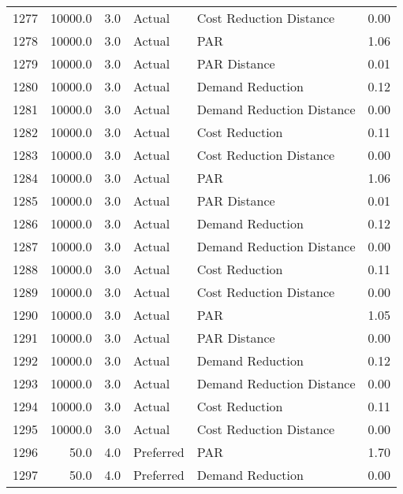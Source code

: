 \begin{longtable}{lrrllr}
1277 &      10000.0 &     3.0 &         Actual &    Cost Reduction Distance &   0.00 \\
1278 &      10000.0 &     3.0 &         Actual &                        PAR &   1.06 \\
1279 &      10000.0 &     3.0 &         Actual &               PAR Distance &   0.01 \\
1280 &      10000.0 &     3.0 &         Actual &           Demand Reduction &   0.12 \\
1281 &      10000.0 &     3.0 &         Actual &  Demand Reduction Distance &   0.00 \\
1282 &      10000.0 &     3.0 &         Actual &             Cost Reduction &   0.11 \\
1283 &      10000.0 &     3.0 &         Actual &    Cost Reduction Distance &   0.00 \\
1284 &      10000.0 &     3.0 &         Actual &                        PAR &   1.06 \\
1285 &      10000.0 &     3.0 &         Actual &               PAR Distance &   0.01 \\
1286 &      10000.0 &     3.0 &         Actual &           Demand Reduction &   0.12 \\
1287 &      10000.0 &     3.0 &         Actual &  Demand Reduction Distance &   0.00 \\
1288 &      10000.0 &     3.0 &         Actual &             Cost Reduction &   0.11 \\
1289 &      10000.0 &     3.0 &         Actual &    Cost Reduction Distance &   0.00 \\
1290 &      10000.0 &     3.0 &         Actual &                        PAR &   1.05 \\
1291 &      10000.0 &     3.0 &         Actual &               PAR Distance &   0.00 \\
1292 &      10000.0 &     3.0 &         Actual &           Demand Reduction &   0.12 \\
1293 &      10000.0 &     3.0 &         Actual &  Demand Reduction Distance &   0.00 \\
1294 &      10000.0 &     3.0 &         Actual &             Cost Reduction &   0.11 \\
1295 &      10000.0 &     3.0 &         Actual &    Cost Reduction Distance &   0.00 \\
1296 &         50.0 &     4.0 &      Preferred &                        PAR &   1.70 \\
1297 &         50.0 &     4.0 &      Preferred &           Demand Reduction &   0.00 \\

\end{longtable}
